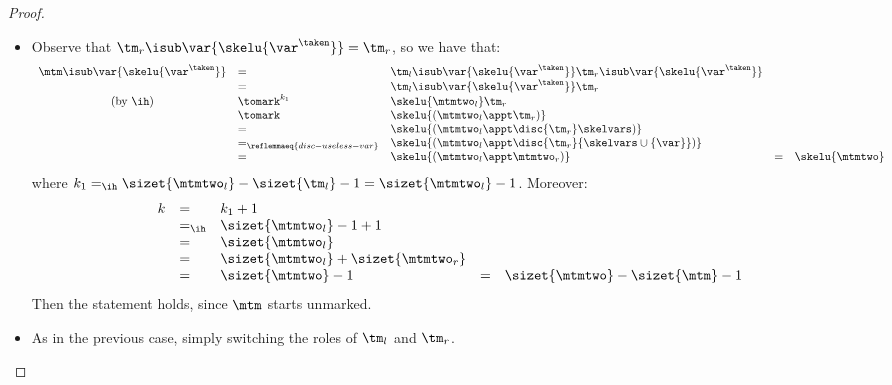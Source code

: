 \begin{proof}
\begin{itemize}
\begin{itemize}
\item {}
Observe that $\tm_r\isub\var{\skelu{\var^\taken}} = \tm_r$, so we have that:
\[\begin{array}{cllllll}
\mtm\isub\var{\skelu{\var^\taken}} &= &
  \tm_l\isub\var{\skelu{\var^\taken}} \tm_r\isub\var{\skelu{\var^\taken}} 
  \\
  &= &
  \tm_l\isub\var{\skelu{\var^\taken}} \tm_r
  \\
  \mbox{(by \ih)} &\tomark^{k_1} & 
  \skelu{\mtmtwo_l}  \tm_r 
  \\
  &\tomark&
   \skelu{(\mtmtwo_l \appt \tm_r)} 
   \\
  &=&
  \skelu{(\mtmtwo_l\appt\disc{\tm_r}\skelvars)} 
  \\
  &=_{\reflemmaeq{disc-useless-var}}&
  \skelu{(\mtmtwo_l\appt\disc{\tm_r}{\skelvars \cup \{\var\}})} 
  \\
  &=&\skelu{(\mtmtwo_l\appt\mtmtwo_r)} 
   &= &
   \skelu{\mtmtwo}
\end{array}\]
where $k_1 =_{\ih} \sizet{\mtmtwo_l} - \sizet{\tm_l} -1 = \sizet{\mtmtwo_l} -1$. Moreover:
\[\begin{array}{lllllll}
k & = & k_1 + 1
\\
& =_{\ih} & \sizet{\mtmtwo_l} -1 +1
\\
& = & \sizet{\mtmtwo_l}
\\
& = & \sizet{\mtmtwo_l} + \sizet{\mtmtwo_r}
\\
& = & \sizet{\mtmtwo} -1
%
& = & \sizet{\mtmtwo} - \sizet{\mtm} - 1
\end{array}\]
Then the statement holds, since $\mtm$ starts unmarked.


\item {} As in the previous case, simply switching the roles of $\tm_l$ and $\tm_r$.
\end{itemize}




\end{itemize}
\end{proof}
